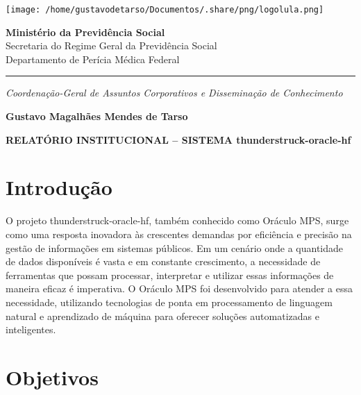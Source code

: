 \documentclass[11pt]{article}
\author{Gustavo M. Mendes de Tarso}
\date{\today}
\title{}
\begin{document}
\begin{center}
\texttt{[image: /home/gustavodetarso/Documentos/.share/png/logolula.png]}
\end{center}

\vspace{-1.8cm}
\begin{center}
\textbf{Ministério da Previdência Social}\\
Secretaria do Regime Geral da Previdência Social\\
Departamento de Perícia Médica Federal
\end{center}

\vspace{-0.3cm}
\hrule

\vspace{-0.3cm}
\begin{center}
\textit{Coordenação-Geral de Assuntos Corporativos e Disseminação de Conhecimento}
\end{center}

\vspace{-0.8cm}
\begin{center}
\textbf{Gustavo Magalhães Mendes de Tarso}
\end{center}

\vspace{1.5cm}

\textbf{RELATÓRIO INSTITUCIONAL – SISTEMA thunderstruck-oracle-hf}

\section{Introdução}
\label{sec:orgf704b06}

O projeto thunderstruck-oracle-hf, também conhecido como Oráculo MPS, surge como uma resposta inovadora às crescentes demandas por eficiência e precisão na gestão de informações em sistemas públicos. Em um cenário onde a quantidade de dados disponíveis é vasta e em constante crescimento, a necessidade de ferramentas que possam processar, interpretar e utilizar essas informações de maneira eficaz é imperativa. O Oráculo MPS foi desenvolvido para atender a essa necessidade, utilizando tecnologias de ponta em processamento de linguagem natural e aprendizado de máquina para oferecer soluções automatizadas e inteligentes.

\section{Objetivos}
\label{sec:orga36bdad}
\end{document}
